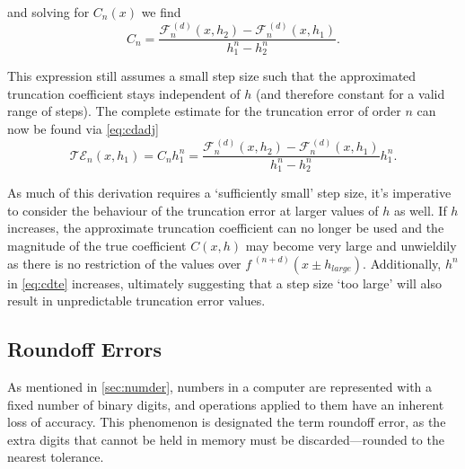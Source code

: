 and solving for $C_n(x)$ we find
\begin{equation}
 C_n = \frac{\mathcal{F}_n^{\,(d)}(x,h_2) - \mathcal{F}_n^{\,(d)}(x,h_1)}{h_1^n - h_2^n}.\label{eq:cdtrcoeff}
\end{equation}

This expression still assumes a small step size such that the approximated truncation coefficient stays independent of $h$ (and therefore constant for a valid range of steps).
The complete estimate for the truncation error of order $n$ can now be found via \cref{eq:cdadj}
\begin{equation}
\mathcal{TE}_n(x,h_1) = C_n h_1^n = \frac{\mathcal{F}_n^{\,(d)}(x,h_2) - \mathcal{F}_n^{\,(d)}(x,h_1)}{h_1^n - h_2^n}h_1^n.\label{eq:cdte}
\end{equation}

As much of this derivation requires a `sufficiently small' step size, it's imperative to consider the behaviour of the truncation error at larger values of $h$ as well.
If $h$ increases, the approximate truncation coefficient can no longer be used and
the magnitude of the true coefficient $C(x,h)$ may become very large and unwieldily as there is no restriction of the values over $f^{\;(n+d)}(x\pm h_{large})$.
Additionally, $h^n$ in \cref{eq:cdte} increases, ultimately suggesting that a step size `too large' will also result in unpredictable truncation error values.

\subsection{Roundoff Errors}\label{sec:roundoff}

As mentioned in \cref{sec:numder}, numbers in a computer are represented with a fixed number of binary digits, and operations applied to them have an inherent loss of accuracy.
This phenomenon is designated the term roundoff error, as the extra digits that cannot be held in memory must be discarded---rounded to the nearest tolerance.


